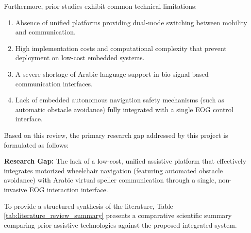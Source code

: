 Furthermore, prior studies exhibit common technical limitations:

\begin{enumerate}[label=\textbf{\arabic*.}]
    \item Absence of unified platforms providing dual-mode switching between mobility and communication.
    \item High implementation costs and computational complexity that prevent deployment on low-cost embedded systems.
    \item A severe shortage of Arabic language support in bio-signal-based communication interfaces.
    \item Lack of embedded autonomous navigation safety mechanisms (such as automatic obstacle avoidance) fully integrated with a single EOG control interface.
\end{enumerate}

Based on this review, the primary research gap addressed by this project is formulated as follows:

\begin{tcolorbox}[colback=blue!5!white,colframe=blue!75!black,title=\textbf{Formulated Research Gap}]
\textbf{Research Gap:} The lack of a low-cost, unified assistive platform that effectively integrates motorized wheelchair navigation (featuring automated obstacle avoidance) with Arabic virtual speller communication through a single, non-invasive EOG interaction interface.
\end{tcolorbox}

To provide a structured synthesis of the literature, Table \ref{tab:literature_review_summary} presents a comparative scientific summary comparing prior assistive technologies against the proposed integrated system.


